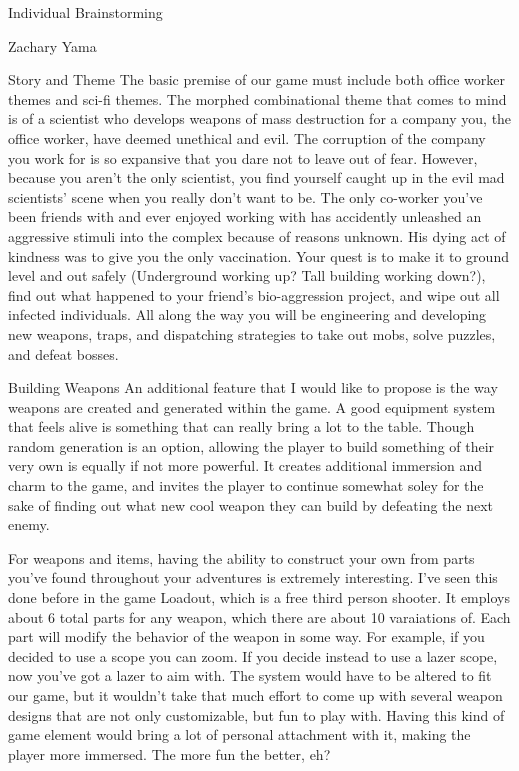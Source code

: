\documentclass[12pt]{report}
\begin{document}
\begin{section}{Individual Brainstorming}
\begin{subsection}{Zachary Yama}
\begin{subsubsection}{Story and Theme}
The basic premise of our game must include both office worker themes and
sci-fi themes. The morphed combinational theme that comes to mind is of a
scientist who develops weapons of mass destruction for a company you, the
office worker, have deemed unethical and evil. The corruption of the company
you work for is so expansive that you dare not to leave out of fear.
However, because you aren’t the only scientist, you find yourself caught up
in the evil mad scientists’ scene when you really don’t want to be. The only
co-worker you’ve been friends with and ever enjoyed working with has
accidently unleashed an aggressive stimuli into the complex because of
reasons unknown. His dying act of kindness was to give you the only
vaccination. Your quest is to make it to ground level and out safely
(Underground working up? Tall building working down?), find out what
happened to your friend’s bio-aggression project, and wipe out all infected
individuals. All along the way you will be engineering and developing new
weapons, traps, and dispatching strategies to take out mobs, solve puzzles,
and defeat bosses.
\end{subsubsection}

\begin{subsubsection}{Building Weapons}
An additional feature that I would like to propose is the way weapons are
created and generated within the game. A good equipment system that feels
alive is something that can really bring a lot to the table. Though random
generation is an option, allowing the player to build something of their
very own is equally if not more powerful. It creates additional immersion
and charm to the game, and invites the player to continue somewhat soley for
the sake of finding out what new cool weapon they can build by defeating
the next enemy.

For weapons and items, having the ability to construct your own from parts
you've found throughout your adventures is extremely interesting. I've
seen this done before in the game Loadout, which is a free third person
shooter. It employs about 6 total parts for any weapon, which there are
about 10 varaiations of. Each part will modify the behavior of the weapon in
some way. For example, if you decided to use a scope you can zoom. If you
decide instead to use a lazer scope, now you've got a lazer to aim with. The
system would have to be altered to fit our game, but it wouldn't take that
much effort to come up with several weapon designs that are not only
customizable, but fun to play with. Having this kind of game element would
bring a lot of personal attachment with it, making the player more immersed.
The more fun the better, eh?
\end{subsubsection}
\end{subsection}
\end{section}
\end{document}
